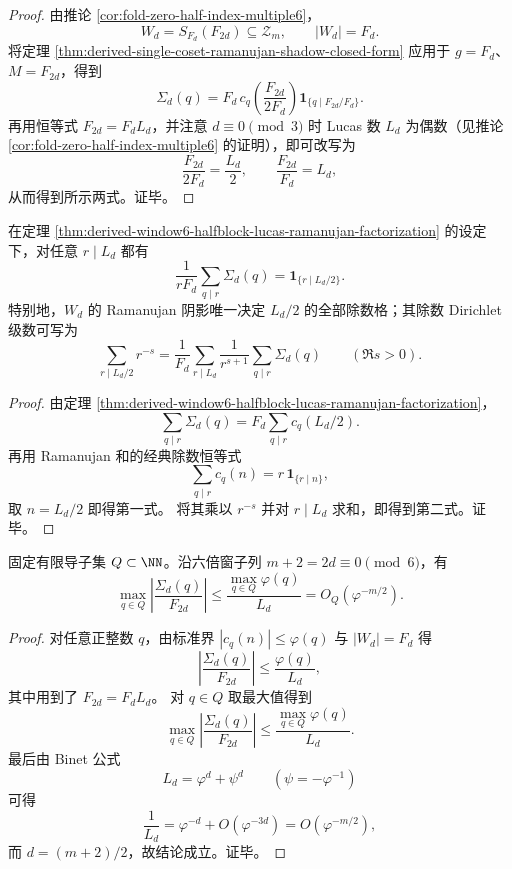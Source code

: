 \begin{proof}
由推论 \ref{cor:fold-zero-half-index-multiple6}，
\[
W_d=S_{F_d}(F_{2d})\subseteq \mathcal Z_m,
\qquad
|W_d|=F_d.
\]
将定理 \ref{thm:derived-single-coset-ramanujan-shadow-closed-form}
应用于 \(g=F_d\)、\(M=F_{2d}\)，得到
\[
\Sigma_d(q)
=
F_d\,
c_q\!\left(\frac{F_{2d}}{2F_d}\right)
\mathbf 1_{\{q\mid F_{2d}/F_d\}}.
\]
再用恒等式 \(F_{2d}=F_dL_d\)，并注意 \(d\equiv 0\pmod 3\) 时 Lucas 数 \(L_d\) 为偶数（见推论 \ref{cor:fold-zero-half-index-multiple6} 的证明），即可改写为
\[
\frac{F_{2d}}{2F_d}=\frac{L_d}{2},
\qquad
\frac{F_{2d}}{F_d}=L_d,
\]
从而得到所示两式。证毕。
\end{proof}

\begin{corollary}\label{cor:derived-window6-halfblock-recovers-lucas-divisor-lattice}
在定理 \ref{thm:derived-window6-halfblock-lucas-ramanujan-factorization} 的设定下，对任意 \(r\mid L_d\) 都有
\[
\boxed{\;
\frac{1}{rF_d}\sum_{q\mid r}\Sigma_d(q)
=
\mathbf 1_{\{r\mid L_d/2\}}.\;}
\]
特别地，\(W_d\) 的 Ramanujan 阴影唯一决定 \(L_d/2\) 的全部除数格；其除数 Dirichlet 级数可写为
\[
\boxed{\;
\sum_{r\mid L_d/2}r^{-s}
=
\frac{1}{F_d}\sum_{r\mid L_d}\frac{1}{r^{s+1}}
\sum_{q\mid r}\Sigma_d(q)
\qquad (\Re s>0).\;}
\]
\end{corollary}

\begin{proof}
由定理 \ref{thm:derived-window6-halfblock-lucas-ramanujan-factorization}，
\[
\sum_{q\mid r}\Sigma_d(q)
=
F_d\sum_{q\mid r}c_q(L_d/2).
\]
再用 Ramanujan 和的经典除数恒等式
\[
\sum_{q\mid r}c_q(n)=r\,\mathbf 1_{\{r\mid n\}},
\]
取 \(n=L_d/2\) 即得第一式。
将其乘以 \(r^{-s}\) 并对 \(r\mid L_d\) 求和，即得到第二式。证毕。
\end{proof}

\begin{theorem}[固定导子对半阶见证块的指数级失明]\label{thm:derived-window6-halfblock-fixed-conductor-blindness}
固定有限导子集 \(Q\subset \NN\)。沿六倍窗子列 \(m+2=2d\equiv 0\pmod 6\)，有
\[
\boxed{\;
\max_{q\in Q}
\left|
\frac{\Sigma_d(q)}{F_{2d}}
\right|
\le
\frac{\max_{q\in Q}\varphi(q)}{L_d}
=
O_Q(\varphi^{-m/2}).\;}
\]
\end{theorem}

\begin{proof}
对任意正整数 \(q\)，由标准界 \(|c_q(n)|\le \varphi(q)\) 与 \(|W_d|=F_d\) 得
\[
\left|
\frac{\Sigma_d(q)}{F_{2d}}
\right|
\le
\frac{\varphi(q)}{L_d},
\]
其中用到了 \(F_{2d}=F_dL_d\)。
对 \(q\in Q\) 取最大值得到
\[
\max_{q\in Q}
\left|
\frac{\Sigma_d(q)}{F_{2d}}
\right|
\le
\frac{\max_{q\in Q}\varphi(q)}{L_d}.
\]
最后由 Binet 公式
\[
L_d=\varphi^d+\psi^d
\qquad
(\psi=-\varphi^{-1})
\]
可得
\[
\frac1{L_d}
=
\varphi^{-d}+O(\varphi^{-3d})
=
O(\varphi^{-m/2}),
\]
而 \(d=(m+2)/2\)，故结论成立。证毕。
\end{proof}

